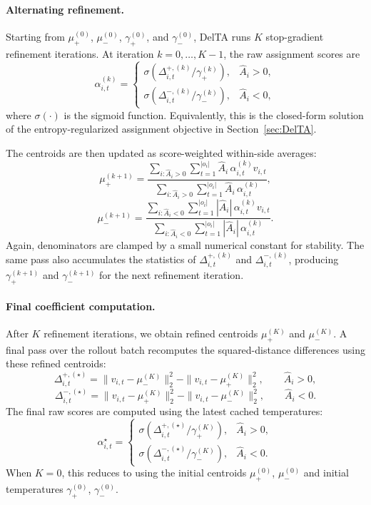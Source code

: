 \documentclass{article} %
\begin{document}
\paragraph{Alternating refinement.}
Starting from \(\mu_+^{(0)}\), \(\mu_-^{(0)}\), \(\gamma_+^{(0)}\), and \(\gamma_-^{(0)}\), DelTA runs \(K\) stop-gradient refinement iterations.
At iteration \(k=0,\dots,K-1\), the raw assignment scores are
\[
\alpha_{i,t}^{(k)}
=
\begin{cases}
\sigma\!\left(
\Delta_{i,t}^{+,(k)}/\gamma_+^{(k)}
\right),
& \hat A_i>0,\\[1.0ex]
\sigma\!\left(
\Delta_{i,t}^{-,(k)}/\gamma_-^{(k)}
\right),
& \hat A_i<0,
\end{cases}
\]
where \(\sigma(\cdot)\) is the sigmoid function.
Equivalently, this is the closed-form solution of the entropy-regularized assignment objective in Section~\ref{sec:DelTA}.

The centroids are then updated as score-weighted within-side averages:
\[
\mu_+^{(k+1)}
=
\frac{
\sum_{i:\hat A_i>0}\sum_{t=1}^{|o_i|}
\hat A_i\,\alpha_{i,t}^{(k)}v_{i,t}
}{
\sum_{i:\hat A_i>0}\sum_{t=1}^{|o_i|}
\hat A_i\,\alpha_{i,t}^{(k)}
},
\]
\[
\mu_-^{(k+1)}
=
\frac{
\sum_{i:\hat A_i<0}\sum_{t=1}^{|o_i|}
|\hat A_i|\,\alpha_{i,t}^{(k)}v_{i,t}
}{
\sum_{i:\hat A_i<0}\sum_{t=1}^{|o_i|}
|\hat A_i|\,\alpha_{i,t}^{(k)}
}.
\]
Again, denominators are clamped by a small numerical constant for stability.
The same pass also accumulates the statistics of \(\Delta_{i,t}^{+,(k)}\) and \(\Delta_{i,t}^{-,(k)}\), producing \(\gamma_+^{(k+1)}\) and \(\gamma_-^{(k+1)}\) for the next refinement iteration.

\paragraph{Final coefficient computation.}
After \(K\) refinement iterations, we obtain refined centroids \(\mu_+^{(K)}\) and \(\mu_-^{(K)}\).
A final pass over the rollout batch recomputes the squared-distance differences using these refined centroids:
\[
\Delta_{i,t}^{+,(\star)}
=
\|v_{i,t}-\mu_-^{(K)}\|_2^2
-
\|v_{i,t}-\mu_+^{(K)}\|_2^2,
\qquad \hat A_i>0,
\]
\[
\Delta_{i,t}^{-,(\star)}
=
\|v_{i,t}-\mu_+^{(K)}\|_2^2
-
\|v_{i,t}-\mu_-^{(K)}\|_2^2,
\qquad \hat A_i<0.
\]
The final raw scores are computed using the latest cached temperatures:
\[
\alpha_{i,t}^{\star}
=
\begin{cases}
\sigma\!\left(
\Delta_{i,t}^{+,(\star)}/\gamma_+^{(K)}
\right),
& \hat A_i>0,\\[1.0ex]
\sigma\!\left(
\Delta_{i,t}^{-,(\star)}/\gamma_-^{(K)}
\right),
& \hat A_i<0.
\end{cases}
\]
When \(K=0\), this reduces to using the initial centroids \(\mu_+^{(0)}\), \(\mu_-^{(0)}\) and initial temperatures \(\gamma_+^{(0)}\), \(\gamma_-^{(0)}\).
\end{document}
